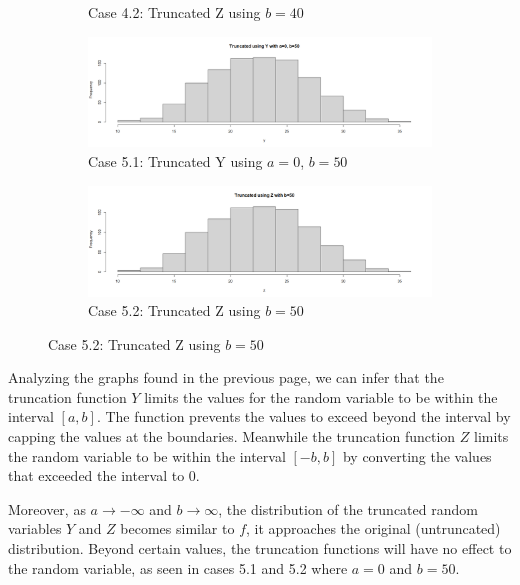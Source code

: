 \documentclass[12pt,letterpaper]{article}
\begin{document}
\begin{enumerate}[label=\Alph*]
\begin{figure}[H]
\begin{subfigure}[H]{0.49\textwidth}
          \caption*{\footnotesize Case 4.2: Truncated Z using $b=40$}
        \end{subfigure}
        \begin{subfigure}[H]{0.49\textwidth}
          \includegraphics[width=\textwidth]{Y-0-50.png}
          \caption*{\footnotesize Case 5.1: Truncated Y using $a=0$, $b=50$}
        \end{subfigure}
        \begin{subfigure}[H]{0.49\textwidth}
          \includegraphics[width=\textwidth]{Z-50.png}
          \caption*{\footnotesize Case 5.2: Truncated Z using $b=50$}
        \end{subfigure}
       \end{figure}
       \vspace{5cm}
       Analyzing the graphs found in the previous page, we can infer that the truncation function $Y$ limits the values for the random variable to be within the interval $[a, b]$. The function prevents the values to exceed beyond the interval by capping the values at the boundaries. Meanwhile the truncation function $Z$ limits the random variable to be within the interval $[-b, b]$ by converting the values that exceeded the interval to 0. 

       Moreover, as $a\rightarrow -\infty$ and $b \rightarrow \infty$, the distribution of the truncated random variables $Y$ and $Z$ becomes similar to $f$, it approaches the original (untruncated) distribution. Beyond certain values, the truncation functions will have no effect to the random variable, as seen in cases 5.1 and 5.2 where $a=0$ and $b=50$.

    \end{enumerate}
    \newpage
\end{document}
